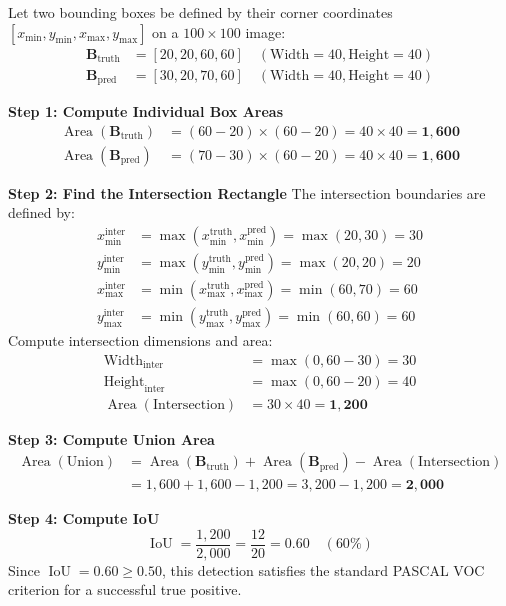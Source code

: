\begin{example}
Let two bounding boxes be defined by their corner coordinates $[x_{\min}, y_{\min}, x_{\max}, y_{\max}]$ on a $100 \times 100$ image:
\begin{align*}
\mathbf{B}_{\text{truth}} &= [20, 20, 60, 60] \quad (\text{Width} = 40, \text{Height} = 40) \\
\mathbf{B}_{\text{pred}} &= [30, 20, 70, 60] \quad (\text{Width} = 40, \text{Height} = 40)
\end{align*}

\textbf{Step 1: Compute Individual Box Areas}
\begin{align*}
\operatorname{Area}(\mathbf{B}_{\text{truth}}) &= (60 - 20) \times (60 - 20) = 40 \times 40 = \mathbf{1{,}600} \\
\operatorname{Area}(\mathbf{B}_{\text{pred}}) &= (70 - 30) \times (60 - 20) = 40 \times 40 = \mathbf{1{,}600}
\end{align*}

\textbf{Step 2: Find the Intersection Rectangle}
The intersection boundaries are defined by:
\begin{align*}
x_{\min}^{\text{inter}} &= \max(x_{\min}^{\text{truth}}, x_{\min}^{\text{pred}}) = \max(20, 30) = 30 \\
y_{\min}^{\text{inter}} &= \max(y_{\min}^{\text{truth}}, y_{\min}^{\text{pred}}) = \max(20, 20) = 20 \\
x_{\max}^{\text{inter}} &= \min(x_{\max}^{\text{truth}}, x_{\max}^{\text{pred}}) = \min(60, 70) = 60 \\
y_{\max}^{\text{inter}} &= \min(y_{\max}^{\text{truth}}, y_{\max}^{\text{pred}}) = \min(60, 60) = 60
\end{align*}
Compute intersection dimensions and area:
\begin{align*}
\text{Width}_{\text{inter}} &= \max(0, 60 - 30) = 30 \\
\text{Height}_{\text{inter}} &= \max(0, 60 - 20) = 40 \\
\operatorname{Area}(\text{Intersection}) &= 30 \times 40 = \mathbf{1{,}200}
\end{align*}

\textbf{Step 3: Compute Union Area}
\begin{align*}
\operatorname{Area}(\text{Union}) &= \operatorname{Area}(\mathbf{B}_{\text{truth}}) + \operatorname{Area}(\mathbf{B}_{\text{pred}}) - \operatorname{Area}(\text{Intersection}) \\
                                  &= 1{,}600 + 1{,}600 - 1{,}200 = 3{,}200 - 1{,}200 = \mathbf{2{,}000}
\end{align*}

\textbf{Step 4: Compute IoU}
\begin{equation*}
\operatorname{IoU} = \frac{1{,}200}{2{,}000} = \frac{12}{20} = \mathbf{0.60} \quad (60\%)
\end{equation*}
Since $\operatorname{IoU} = 0.60 \ge 0.50$, this detection satisfies the standard PASCAL VOC criterion for a successful true positive.
\end{example}

